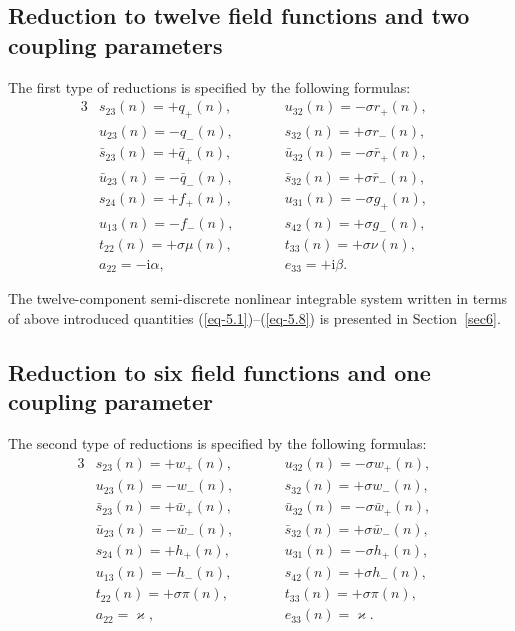 \documentclass[pdftex]{sigma}
\numberwithin{equation}{section}
\begin{document}
\subsection{Reduction to twelve field functions and two coupling parameters}\label{sec5.1}
The first type of reductions is specified by the following formulas:
\begin{alignat}{3}\label{eq-5.1}
	&s_{23}(n)=+q_{+}(n), \qquad&& u_{32}(n)=-\sigma r_{+}(n),&
\\ \label{eq-5.2}
	&u_{23}(n)=-q_{-}(n), \qquad&& s_{32}(n)=+\sigma r_{-}(n),&
\\ \label{eq-5.3}
	&\bar{s}_{23}(n)=+\bar{q}_{+}(n), \qquad&& \bar{u}_{32}(n)=-\sigma \bar{r}_{+}(n),&
\\ \label{eq-5.4}
	&\bar{u}_{23}(n)=-\bar{q}_{-}(n), \qquad&& \bar{s}_{32}(n)=+\sigma \bar{r}_{-}(n),&
\\ \label{eq-5.5}
	&s_{24}(n)=+f_{+}(n), \qquad&& u_{31}(n)=-\sigma g_{+}(n),&
\\ \label{eq-5.6}
	&u_{13}(n)=-f_{-}(n), \qquad&& s_{42}(n)=+\sigma g_{-}(n),&
\\ \label{eq-5.7}
	&t_{22}(n)=+\sigma \mu(n), \qquad&& t_{33}(n)=+\sigma \nu(n),&
\\ \label{eq-5.8}
	&a_{22}=-\mathrm{i}\alpha, \qquad&& e_{33}=+\mathrm{i}\beta .&
\end{alignat}

The twelve-component semi-discrete nonlinear integrable system written in terms of above introduced quantities (\ref{eq-5.1})--(\ref{eq-5.8}) is presented in Section~\ref{sec6}.

\subsection{Reduction to six field functions and one coupling parameter}\label{sec5.2}
The second type of reductions is specified by the following formulas:
\begin{alignat}{3}\label{eq-5.9}
&s_{23}(n)=+w_{+}(n), \qquad&& u_{32}(n)=-\sigma w_{+}(n),&
\\ \label{eq-5.10}
&u_{23}(n)=-w_{-}(n), \qquad&& s_{32}(n)=+\sigma w_{-}(n),&
\\ \label{eq-5.11}
&\bar{s}_{23}(n)=+\bar{w}_{+}(n), \qquad&& \bar{u}_{32}(n)=-\sigma \bar{w}_{+}(n),&
\\ \label{eq-5.12}
&\bar{u}_{23}(n)=-\bar{w}_{-}(n), \qquad&& \bar{s}_{32}(n)=+\sigma \bar{w}_{-}(n),&
\\ \label{eq-5.13}
&s_{24}(n)=+h_{+}(n), \qquad&& u_{31}(n)=-\sigma h_{+}(n),&
\\ \label{eq-5.14}
&u_{13}(n)=-h_{-}(n), \qquad&& s_{42}(n)=+\sigma h_{-}(n),&
\\ \label{eq-5.15}
&t_{22}(n)=+\sigma \pi(n), \qquad&& t_{33}(n)=+\sigma \pi(n),&
\\ \label{eq-5.16}
&a_{22}=\varkappa, \qquad&& e_{33}(n)=\varkappa .&
\end{alignat}
\end{document}
